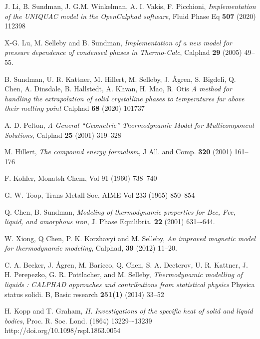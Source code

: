\documentclass[12pt]{article}
\begin{document}
\begin{thebibliography}{91zzz}
 J. Li, B. Sundman, J. G.M. Winkelman, A. I. Vakis,
  F. Picchioni, {\em Implementation of the UNIQUAC model in the
    OpenCalphad software}, Fluid Phase Eq {\bf 507} (2020) 112398

 X-G. Lu, M. Selleby and B. Sundman, {\em Implementation
  of a new model for pressure dependence of condensed phases in
  Thermo-Calc}, Calphad {\bf 29} (2005) 49--55.

 B. Sundman, U. R. Kattner, M. Hillert, M.  Selleby,
  J. Ågren, S. Bigdeli, Q. Chen, A. Dinsdale, B. Hallstedt, A. Khvan,
  H. Mao, R. Otis {\em A method for handling the extrapolation of
    solid crystalline phases to temperatures far above their melting
    point} Calphad {\bf 68} (2020) 101737

 A. D. Pelton, {\em A General ``Geometric''
  Thermodynamic Model for Multicomponent Solutions}, Calphad {\bf 25}
  (2001) 319--328

 M. Hillert, {\em The compound energy formalism},
  J All. and Comp. {\bf 320} (2001) 161--176
  
 F. Kohler, Monatsh Chem, Vol 91 (1960) 738--740
  
  G. W. Toop, Trans Metall Soc, AIME  Vol 233 (1965) 850--854
  
 Q. Chen, B. Sundman, {\em Modeling of thermodynamic
  properties for Bcc, Fcc, liquid, and amorphous iron}, J. Phase
  Equilibria. {\bf 22} (2001) 631–-644.

 W. Xiong, Q Chen, P. K. Korzhavyi and M. Selleby,
  {\em An improved magnetic model for thermodynamic modeling},
  Calphad, {\bf 39} (2012) 11--20.

 C. A. Becker, J. Ågren, M. Baricco, Q. Chen,
  S. A. Decterov, U. R. Kattner, J. H. Perepezko, G. R. Pottlacher,
  and M. Selleby, {\em Thermodynamic modelling of liquids : CALPHAD
    approaches and contributions from statistical physics} Physica
  status solidi. B, Basic research {\bf 251(1)} (2014) 33--52

 H. Kopp and T. Graham, {\em II. Investigations
  of the specific heat of solid and liquid bodies},
  Proc. R. Soc. Lond. (1864) 13229–-13239
  http://doi.org/10.1098/rspl.1863.0054


\end{thebibliography}

\newpage
\end{document}
